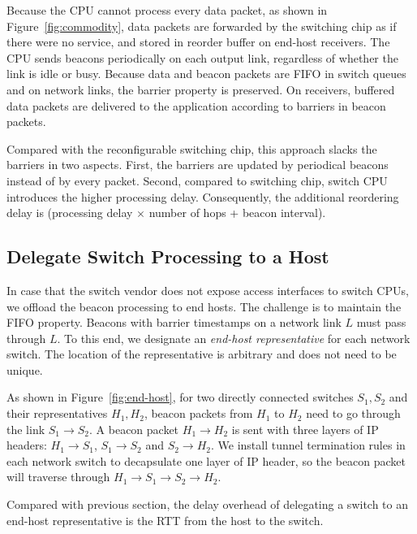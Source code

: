 Because the CPU cannot process every data packet, as shown in Figure~\ref{fig:commodity}, data packets are forwarded by the switching chip as if there were no \sys service, and stored in reorder buffer on end-host receivers.
The CPU sends beacons periodically on each output link, regardless of whether the link is idle or busy.
Because data and beacon packets are FIFO in switch queues and on network links, the barrier property is preserved. On receivers, buffered data packets are delivered to the application according to barriers in beacon packets.

Compared with the reconfigurable switching chip, this approach slacks the barriers in two aspects.
First, the barriers are updated by periodical beacons instead of by every packet.
Second, compared to switching chip, switch CPU introduces the higher processing delay. Consequently, the additional reordering delay is (processing delay $\times$ number of hops + beacon interval).

\subsection{Delegate Switch Processing to a Host}
\label{sec:end-host}

In case that the switch vendor does not expose access interfaces to switch CPUs, we offload the beacon processing to end hosts. The challenge is to maintain the FIFO property.
Beacons with barrier timestamps on a network link $L$ must pass through $L$.
To this end, we designate an \textit{end-host representative} for each network switch.
The location of the representative is arbitrary and does not need to be unique.

As shown in Figure~\ref{fig:end-host}, for two directly connected switches $S_1, S_2$ and their representatives $H_1, H_2$, beacon packets from $H_1$ to $H_2$ need to go through the link $S_1 \rightarrow S_2$.
A beacon packet $H_1 \rightarrow H_2$ is sent with three layers of IP headers: $H_1 \rightarrow S_1$, $S_1 \rightarrow S_2$ and $S_2 \rightarrow H_2$.
We install tunnel termination rules in each network switch to decapsulate one layer of IP header, so the beacon packet will traverse through $H_1 \rightarrow S_1 \rightarrow S_2 \rightarrow H_2$.

Compared with previous section, the delay overhead of delegating a switch to an end-host representative is the RTT from the host to the switch.
